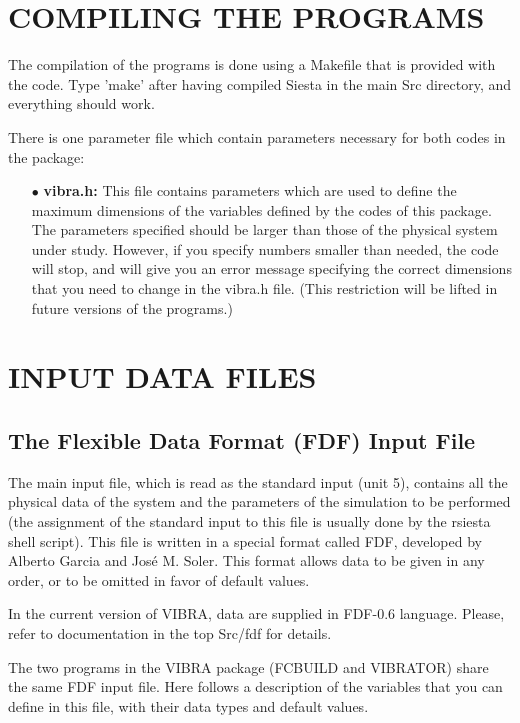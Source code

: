 \section{COMPILING THE PROGRAMS}

\noindent
The compilation of the programs is done using a Makefile
that is provided with the code. Type 'make' after having
compiled Siesta in the main Src directory, and everything
should work.

\noindent
There is  one parameter file which contain
parameters necessary for both codes in the package:

\begin{itemize}

\item[$\bullet$] {\bf vibra.h:}
This file contains parameters which are used
to define the maximum dimensions of the variables defined 
by the codes of this package. 
The parameters specified should be larger than
those of the physical system under study.  However, if you 
specify numbers smaller than needed, the code will stop, 
and will give you an error message specifying the correct
dimensions that you need to change in the vibra.h file.
(This restriction will be lifted in future versions of
the programs.)

\end{itemize}


\section{INPUT DATA FILES}

\subsection{The Flexible Data Format (FDF) Input File}

\noindent
The main input file, which is read as the standard input (unit 5),
contains all the physical data of the system and the parameters of 
the simulation to be performed (the assignment of the standard
input to this file is usually done by the rsiesta shell script).
This file is written in a special format called FDF, developed by 
Alberto Garcia and Jos\'e M. Soler. This format allows data to be 
given in any order, or to be omitted in favor of default values.

\noindent
In the current version of VIBRA, data are 
supplied in FDF-0.6 language.
Please, refer to documentation in the top Src/fdf for details.

\noindent
The two programs in the VIBRA package (FCBUILD and VIBRATOR)
share the same FDF input file. 
Here follows a description of the variables that you can
define in this file, with their data types and
default values.

